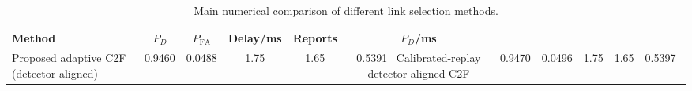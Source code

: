 \begin{table}[t]
    \centering
    \caption{Main numerical comparison of different link selection methods.}
    \label{tab:main_summary}
    \begin{tabular}{l c c c c c}
        \hline
        Method & $P_D$ & $P_{\mathrm{FA}}$ & Delay/ms & Reports & $P_D$/ms \\
        \hline
        Proposed adaptive C2F (detector-aligned) & 0.9460 & 0.0488 & 1.75 & 1.65 & 0.5391 \
        Calibrated-replay detector-aligned C2F & 0.9470 & 0.0496 & 1.75 & 1.65 & 0.5397 \
        \hline
    \end{tabular}
\end{table}

